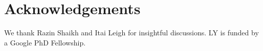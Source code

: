 \section{Acknowledgements}
We thank Razin Shaikh and Itai Leigh for insightful discussions.
LY is funded by a Google PhD Fellowship.